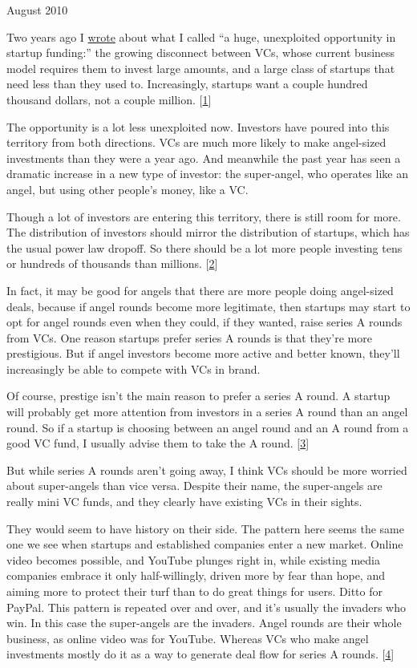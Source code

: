 August 2010

Two years ago I
\href{http://www.paulgraham.com/googles.html\#next}{wrote} about what I
called ``a huge, unexploited opportunity in startup funding:'' the
growing disconnect between VCs, whose current business model requires
them to invest large amounts, and a large class of startups that need
less than they used to. Increasingly, startups want a couple hundred
thousand dollars, not a couple million. {[}\hyperref[f1n]{1}{]}

The opportunity is a lot less unexploited now. Investors have poured
into this territory from both directions. VCs are much more likely to
make angel-sized investments than they were a year ago. And meanwhile
the past year has seen a dramatic increase in a new type of investor:
the super-angel, who operates like an angel, but using other people's
money, like a VC.

Though a lot of investors are entering this territory, there is still
room for more. The distribution of investors should mirror the
distribution of startups, which has the usual power law dropoff. So
there should be a lot more people investing tens or hundreds of
thousands than millions. {[}\hyperref[f2n]{2}{]}

In fact, it may be good for angels that there are more people doing
angel-sized deals, because if angel rounds become more legitimate, then
startups may start to opt for angel rounds even when they could, if they
wanted, raise series A rounds from VCs. One reason startups prefer
series A rounds is that they're more prestigious. But if angel investors
become more active and better known, they'll increasingly be able to
compete with VCs in brand.

Of course, prestige isn't the main reason to prefer a series A round. A
startup will probably get more attention from investors in a series A
round than an angel round. So if a startup is choosing between an angel
round and an A round from a good VC fund, I usually advise them to take
the A round. {[}\hyperref[f3n]{3}{]}

But while series A rounds aren't going away, I think VCs should be more
worried about super-angels than vice versa. Despite their name, the
super-angels are really mini VC funds, and they clearly have existing
VCs in their sights.

They would seem to have history on their side. The pattern here seems
the same one we see when startups and established companies enter a new
market. Online video becomes possible, and YouTube plunges right in,
while existing media companies embrace it only half-willingly, driven
more by fear than hope, and aiming more to protect their turf than to do
great things for users. Ditto for PayPal. This pattern is repeated over
and over, and it's usually the invaders who win. In this case the
super-angels are the invaders. Angel rounds are their whole business, as
online video was for YouTube. Whereas VCs who make angel investments
mostly do it as a way to generate deal flow for series A rounds.
{[}\hyperref[f4n]{4}{]}

